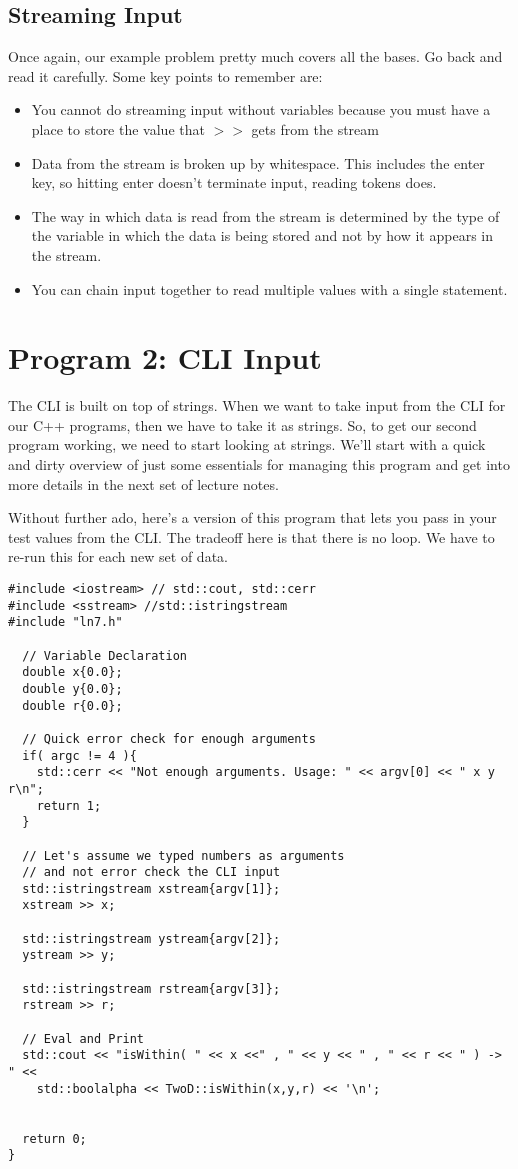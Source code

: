 \documentclass[]{tufte-handout}
\begin{document}
\subsection{Streaming Input}

Once again, our example problem pretty much covers all the bases. Go back and read it carefully. Some key points to remember are:
\begin{itemize}
\item You cannot do streaming input without variables because you must have a place to store the value that $>>$ gets from the stream
\item Data from the stream is broken up by whitespace. This includes the enter key, so hitting enter doesn't terminate input, reading tokens does.
\item The way in which data is read from the stream is determined by the type of the variable in which the data is being stored and not by how it appears in the stream.
\item You can chain input together to read multiple values with a single statement.
\end{itemize}

\section{Program 2: CLI Input}

The CLI is built on top of strings. When we want to take input from the CLI for our C++ programs, then we have to take it as strings.  So, to get our second program working, we need to start looking at strings. We'll start with a quick and dirty overview of just some essentials for managing this program and get into more details in the next set of lecture notes.

Without further ado, here's a version of this program that lets you pass in your test values from the CLI. The tradeoff here is that there is no loop. We have to re-run this for each new set of data.
\begin{verbatim}
#include <iostream> // std::cout, std::cerr
#include <sstream> //std::istringstream
#include "ln7.h"

  // Variable Declaration
  double x{0.0};
  double y{0.0};
  double r{0.0};

  // Quick error check for enough arguments
  if( argc != 4 ){
    std::cerr << "Not enough arguments. Usage: " << argv[0] << " x y r\n";
    return 1;
  }

  // Let's assume we typed numbers as arguments
  // and not error check the CLI input
  std::istringstream xstream{argv[1]};
  xstream >> x;

  std::istringstream ystream{argv[2]};
  ystream >> y;

  std::istringstream rstream{argv[3]};
  rstream >> r;

  // Eval and Print
  std::cout << "isWithin( " << x <<" , " << y << " , " << r << " ) -> " <<
    std::boolalpha << TwoD::isWithin(x,y,r) << '\n';


  return 0;
}
\end{verbatim}
\end{document}
